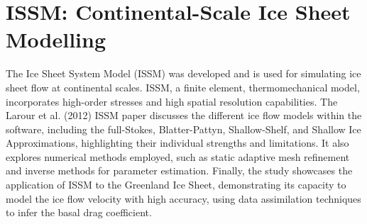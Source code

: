 \section{ISSM: Continental-Scale Ice Sheet Modelling}
The Ice Sheet System Model (ISSM) was developed and is used for simulating ice sheet flow at continental scales. ISSM, a finite element, thermomechanical model, incorporates high-order stresses and high spatial resolution capabilities\cite{ISSM}. The Larour et al. (2012) ISSM paper discusses the different ice flow models within the software, including the full-Stokes, Blatter-Pattyn, Shallow-Shelf, and Shallow Ice Approximations, highlighting their individual strengths and limitations. It also explores numerical methods employed, such as static adaptive mesh refinement and inverse methods for parameter estimation. Finally, the study showcases the application of ISSM to the Greenland Ice Sheet, demonstrating its capacity to model the ice flow velocity with high accuracy, using data assimilation techniques to infer the basal drag coefficient.










